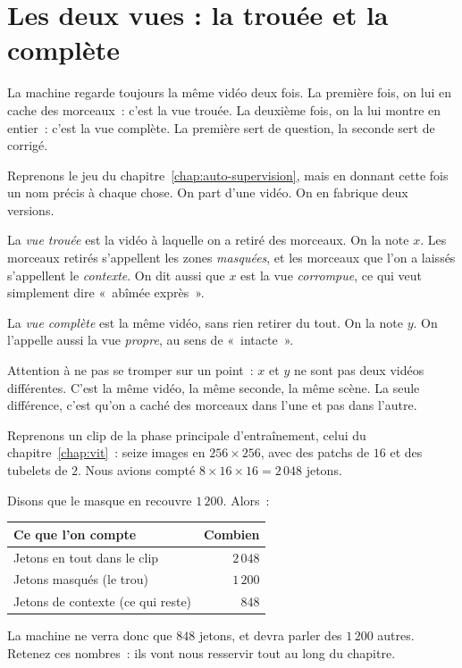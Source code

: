 \section{Les deux vues : la trouée et la complète}

\begin{enclair}
La machine regarde toujours la même vidéo deux fois. La première fois, on
lui en cache des morceaux~: c'est la vue trouée. La deuxième fois, on la lui
montre en entier~: c'est la vue complète. La première sert de question, la
seconde sert de corrigé.
\end{enclair}

Reprenons le jeu du chapitre~\ref{chap:auto-supervision}, mais en donnant
cette fois un nom précis à chaque chose. On part d'une vidéo. On en fabrique
deux versions.

\begin{definition}
La \emph{vue trouée} est la vidéo à laquelle on a retiré des morceaux. On la
note $x$. Les morceaux retirés s'appellent les zones \emph{masquées}, et les
morceaux que l'on a laissés s'appellent le \emph{contexte}. On dit aussi que
$x$ est la vue \emph{corrompue}, ce qui veut simplement dire «~abîmée
exprès~».
\end{definition}

\begin{definition}
La \emph{vue complète} est la même vidéo, sans rien retirer du tout. On la
note $y$. On l'appelle aussi la vue \emph{propre}, au sens de «~intacte~».
\end{definition}

Attention à ne pas se tromper sur un point~: $x$ et $y$ ne sont pas deux
vidéos différentes. C'est la même vidéo, la même seconde, la même scène. La
seule différence, c'est qu'on a caché des morceaux dans l'une et pas dans
l'autre.

\begin{exemple}
Reprenons un clip de la phase principale d'entraînement, celui du
chapitre~\ref{chap:vit}~: seize images en $256 \times 256$, avec des patchs
de $16$ et des tubelets de $2$. Nous avions compté
$8 \times 16 \times 16 = 2\,048$ jetons.

Disons que le masque en recouvre $1\,200$. Alors~:

\begin{center}
\footnotesize
\begin{tabular}{lr}
\toprule
\textbf{Ce que l'on compte} & \textbf{Combien} \\
\midrule
Jetons en tout dans le clip        & $2\,048$ \\
Jetons masqués (le trou)           & $1\,200$ \\
Jetons de contexte (ce qui reste)  & $848$ \\
\bottomrule
\end{tabular}
\end{center}

La machine ne verra donc que $848$ jetons, et devra parler des $1\,200$
autres. Retenez ces nombres~: ils vont nous resservir tout au long du
chapitre.
\end{exemple}

